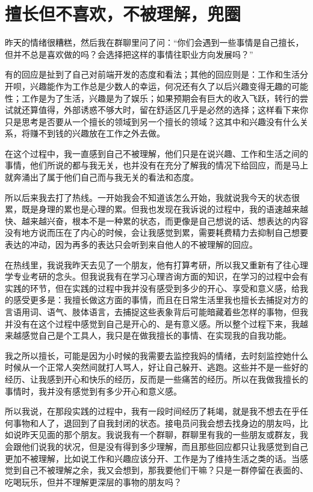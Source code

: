 \chapter{擅长但不喜欢，不被理解，兜圈}




昨天的情绪很糟糕，然后我在群聊里问了问：“你们会遇到一些事情是自己擅长，但并不总是喜欢做的吗？会选择把这样的事情往职业方向发展吗？”

有的回应是扯到了自己对前端开发的态度和看法；其他的回应则是：工作和生活分开呗，兴趣能作为工作总是少数人的幸运，何况还有久了以后兴趣变得无趣的可能性；工作是为了生活，兴趣是为了娱乐；如果预期会有巨大的收入飞跃，转行的尝试就还算值得，外部诱惑不够大时，留在舒适区几乎是必然的选择；这样看下来你只是思考是否要从一个擅长的领域到另一个擅长的领域？这其中和兴趣没有什么关系，将赚不到钱的兴趣放在工作之外去做。

在这个过程中，我一直感到自己不被理解，他们只是在说兴趣、工作和生活之间的事情，他们所说的都与我无关，也并没有在充分了解我的情况下给回应，而是马上就奔涌出了属于他们自己而与我无关的看法和态度。

所以后来我去打了热线。一开始我会不知道该怎么开始，我就说我今天的状态很累，既是身理的累也是心理的累。但我也发现在我诉说的过程中，我的语速越来越快、越来越兴奋，根本不是一种累的状态，而更像是自己想说的话、想表达的内容没有地方说而压在了内心的时候，会让我感觉到累，需要耗费精力去抑制自己想要表达的冲动，因为再多的表达只会听到来自他人的不被理解的回应。

在热线里，我说我昨天去见了一个朋友，他有打算考研，所以我又重新有了往心理学专业考研的念头。但我说我有在学习心理咨询方面的知识，在学习的过程中会有实践的环节，但在实践的过程中我并没有感受到多少的开心、享受和意义感，给我的感受更多是：我擅长做这方面的事情，而且在日常生活里我也擅长去捕捉对方的言语用词、语气、肢体语言，去捕捉这些表象背后可能暗藏着些怎样的事物，但我并没有在这个过程中感觉到自己是开心的、是有意义感。所以整个过程下来，我越来越感觉自己是个工具人，我只是在做我擅长的事情、在实现我的自我功能。

我之所以擅长，可能是因为小时候的我需要去监控我妈的情绪，去时刻监控她什么时候从一个正常人突然间就打人骂人，好让自己躲开、逃跑。这些并不是一些好的经历、让我感到开心和快乐的经历，反而是一些痛苦的经历。所以在我做我擅长的事情时，我并没有感觉到有多少开心和意义感。

所以我说，在那段实践的过程中，我有一段时间经历了耗竭，就是我不想去在乎任何事物和人了，退回到了自我封闭的状态。接电员问我会想去找身边的朋友吗，比如说昨天见面的那个朋友。我说我有一个群聊，群聊里有我的一些朋友或群友，我会跟他们说我的状况，但是没有得到多少理解，而且那些回应都只让我感觉到自己更加不被理解，比如说工作和兴趣应该分开、工作是为了维持生活之类的话。当感觉到自己不被理解之余，我又会想到，那我要他们干嘛？只是一群停留在表面的、吃喝玩乐，但并不理解更深层的事物的朋友吗？

